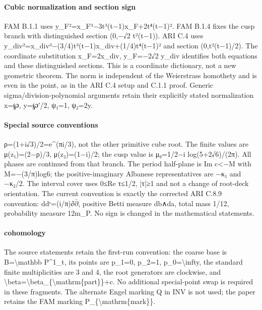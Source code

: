 \paragraph{Cubic normalization and section sign}
FAM B.1.1 uses y\_\allowbreak{}F²=x\_\allowbreak{}F³−3t³(t−1)x\_\allowbreak{}F+2t⁴(t−1)². FAM B.1.4 fixes the cusp branch with distinguished section (0,−√2 t²(t−1)). ARI C.4 uses y\_\allowbreak{}div²=x\_\allowbreak{}div³−(3/\allowbreak{}4)t³(t−1)x\_\allowbreak{}div+(1/\allowbreak{}4)t⁴(t−1)² and section (0,t²(t−1)/\allowbreak{}2). The coordinate substitution x\_\allowbreak{}F=2x\_\allowbreak{}div, y\_\allowbreak{}F=−2√2 y\_\allowbreak{}div identifies both equations and these distinguished sections. This is a coordinate dictionary, not a new geometric theorem. The norm is independent of the Weierstrass homothety and is even in the point, as in the ARI C.4 setup and C.1.1 proof. Generic sigma/\allowbreak{}division-polynomial arguments retain their explicitly stated normalization x=℘, y=℘′/\allowbreak{}2, ψ₁=1, ψ₂=2y.
\paragraph{Special source conventions}
ρ=(1+i√3)/\allowbreak{}2=e\textasciicircum{}(πi/\allowbreak{}3), not the other primitive cube root. The finite values are μ(z₁)=(2−ρ)/\allowbreak{}3, μ(z₂)=(1−i)/\allowbreak{}2; the cusp value is μ₀=1/\allowbreak{}2−i log(5+2√6)/\allowbreak{}(2π). All phases are continued from that branch. The period half-plane is Im c<−M with M=−(3/\allowbreak{}π)log6; the positive-imaginary Albanese representatives are −κ₁ and −κ₂/\allowbreak{}2. The interval cover uses 0≤Re τ≤1/\allowbreak{}2, |τ|≥1 and not a change of root-deck orientation.
The current convention is exactly the corrected ARI C.8.9 convention:\allowbreak{} ddᶜ=(i/\allowbreak{}π)∂\ensuremath{\bar\partial}, positive Betti measure db∧da, total mass 1/\allowbreak{}12, probability measure 12m\_\allowbreak{}P. No sign is changed in the mathematical statements.
\paragraph{cohomology}
The source statements retain the first-run convention:\allowbreak{} the coarse base is B=\textbackslash{}mathbb P\textasciicircum{}1\_\allowbreak{}t, its points are p\_\allowbreak{}1=0, p\_\allowbreak{}2=1, p\_\allowbreak{}0=\textbackslash{}infty, the standard finite multiplicities are 3 and 4, the root generators are clockwise, and \textbackslash{}beta=\textbackslash{}beta\_\allowbreak{}\{\textbackslash{}mathrm\{part\}\}+c. No additional special-point swap is required in these fragments. The alternate Engel marking Q in INV is not used; the paper retains the FAM marking P\_\allowbreak{}\{\textbackslash{}mathrm\{mark\}\}.
